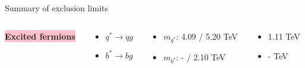 \documentclass[8pt]{beamer}
\newcommand{\mySmallCenterBox}[2][pink] {
   {\centering
    \noindent\colorbox{#1}{
	\textbf{{\small #2}}
    }\par
  }
}
\begin{document}
\begin{frame}{\large Summary of exclusion limits}
   \begin{columns}
  \begin{column}{3cm}
    \mySmallCenterBox{Excited fermions}
  \end{column}
  \begin{column}{3cm}
    \begin{itemize}
     \item[\SixteenStarLight] $q^{*} \to qg$
     \item[\SixteenStarLight] $b^{*} \to bg$
    \end{itemize}
  \end{column}
  \begin{column}{3.3cm}
    \begin{itemize}
     \item[] $m_{q^{*}}$: 4.09 / 5.20 TeV
     \item[] $m_{b^{*}}$: -    / 2.10 TeV
    \end{itemize}
  \end{column}
  \begin{column}{2.7cm}
    \begin{itemize}
     \item[] 1.11 TeV
     \item[] - TeV
    \end{itemize}
  \end{column}
 \end{columns}
 
 \vspace{0.2cm}
 

\end{frame}
\end{document}
